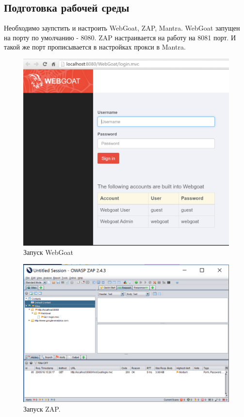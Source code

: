 \documentclass[10pt,a4paper]{article}
\begin{document}
\subsection{Подготовка рабочей среды}
Необходимо заупстить и настроить  WebGoat, ZAP, Mantra.
WebGoat запущен на порту по умолчанию - 8080. ZAP настраивается на работу на 8081 порт. И такой же порт прописывается в настройках прокси в Mantra.

\begin{figure}[H]
\centering
\includegraphics[width=\textwidth]{webgoat_homepage}
\caption{Запуск WebGoat}
\end{figure}

\begin{figure}[H]
\centering
\includegraphics[width=\textwidth]{zap_started}
\caption{Запуск ZAP.}
\end{figure}
\end{document}
